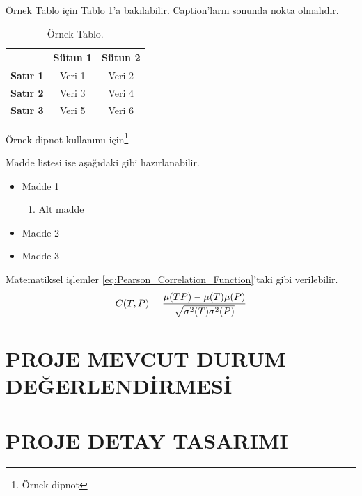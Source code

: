 \documentclass[a4paper,onesided,11pt]{report}
\begin{document}
Örnek Tablo için Tablo \ref{table:ornek_tablo}'a bakılabilir. Caption'ların sonunda nokta olmalıdır.

\begin{table}[thbp]
\caption[Örnek Tablo]{Örnek Tablo.}
\begin{center}
\begin{tabular}{|c|c|c|} \hline
 & \textbf{Sütun 1}& \textbf{Sütun 2}\\\hline
\textbf{Satır 1} & Veri 1 & Veri 2 \\\hline
\textbf{Satır 2} & Veri 3 & Veri 4 \\\hline
\textbf{Satır 3} & Veri 5 & Veri 6 \\\hline
\end{tabular}
\label{table:ornek_tablo}
\end{center}
\end{table}



Örnek dipnot kullanımı için\footnote{Örnek dipnot}  

Madde listesi ise aşağıdaki gibi hazırlanabilir.

\begin{itemize}
 \item Madde 1
\begin{enumerate}
 \item Alt madde
\end{enumerate}
\item Madde 2
\item Madde 3
\end{itemize}

Matematiksel işlemler \eqref{eq:Pearson_Correlation_Function}'taki gibi verilebilir.
\begin{equation} \label{eq:Pearson_Correlation_Function}
C (T, P) = \displaystyle \frac{\mu (TP)-\mu (T) \mu (P)}{\sqrt{\sigma ^2 (T) \sigma ^2 (P)}} \\
\end{equation}

\chapter{PROJE MEVCUT DURUM DEĞERLENDİRMESİ}
\label{chapter:proje_mevcut_durum_degerlendirmesi}

\chapter{PROJE DETAY TASARIMI}
\label{chapter:proje_detay_tasarimi}
\end{document}
